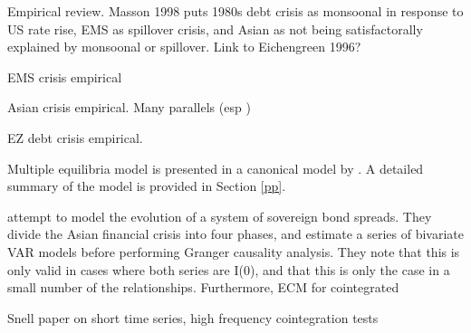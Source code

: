 \documentclass[../base.tex]{subfiles}
\begin{document}
Empirical review. Masson 1998 puts 1980s debt crisis as monsoonal in response to US rate rise, EMS as spillover crisis, and Asian as not being satisfactorally explained by monsoonal or spillover. Link to Eichengreen 1996?

EMS crisis empirical

Asian crisis empirical. Many parallels (esp \cite{kaminsky1999twin})

EZ debt crisis empirical. 



Multiple equilibria model is presented in a canonical model by \cite{pesaran2007econometric}. A detailed summary of the model is provided in Section \ref{pp}.

\cite{sander2003contagion} attempt to model the evolution of a system of sovereign bond spreads. They divide the Asian financial crisis into four phases, and estimate a series of bivariate VAR models before performing Granger causality analysis. They note that this is only valid in cases where both series are I(0), and that this is only the case in a small number of the relationships. Furthermore, ECM for cointegrated

Snell paper on short time series, high frequency cointegration tests


\end{document}
